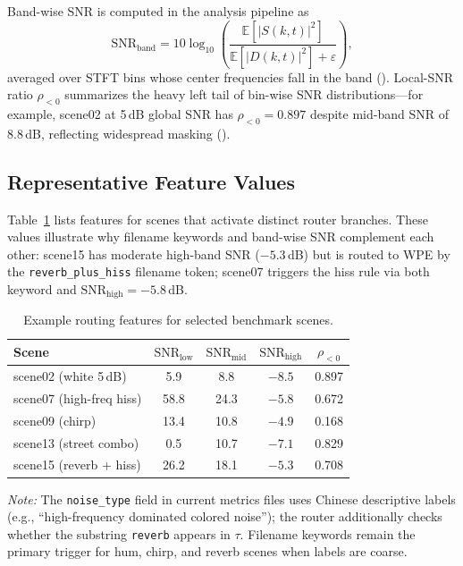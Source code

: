 Band-wise SNR is computed in the analysis pipeline as
\begin{equation}
  \mathrm{SNR}_{\mathrm{band}} = 10\log_{10}\!\left(
    \frac{\mathbb{E}[|S(k,t)|^2]}{\mathbb{E}[|D(k,t)|^2]+\varepsilon}
  \right),
\end{equation}
averaged over STFT bins whose center frequencies fall in the band (). Local-SNR ratio $\rho_{<0}$ summarizes the heavy left tail of bin-wise SNR distributions---for example, scene02 at 5\,dB global SNR has $\rho_{<0}=0.897$ despite mid-band SNR of 8.8\,dB, reflecting widespread masking ().

\subsection{Representative Feature Values}

Table~\ref{tab:routing_feature_examples} lists features for scenes that activate distinct router branches. These values illustrate why filename keywords and band-wise SNR complement each other: scene15 has moderate high-band SNR ($-5.3$\,dB) but is routed to WPE by the \texttt{reverb\_plus\_hiss} filename token; scene07 triggers the hiss rule via both keyword and $\mathrm{SNR}_{\mathrm{high}}=-5.8$\,dB.

\begin{table}[H]
  \centering
  \caption{Example routing features for selected benchmark scenes.}
  \label{tab:routing_feature_examples}
  \small
  \begin{tabular}{lcccc}
    \toprule
    \textbf{Scene} & $\mathrm{SNR}_{\mathrm{low}}$ & $\mathrm{SNR}_{\mathrm{mid}}$ & $\mathrm{SNR}_{\mathrm{high}}$ & $\rho_{<0}$ \\
    \midrule
    scene02 (white 5\,dB)       & 5.9  & 8.8  & $-8.5$ & 0.897 \\
    scene07 (high-freq hiss)    & 58.8 & 24.3 & $-5.8$ & 0.672 \\
    scene09 (chirp)             & 13.4 & 10.8 & $-4.9$ & 0.168 \\
    scene13 (street combo)      & 0.5  & 10.7 & $-7.1$ & 0.829 \\
    scene15 (reverb + hiss)     & 26.2 & 18.1 & $-5.3$ & 0.708 \\
    \bottomrule
  \end{tabular}
\end{table}

\noindent
\textit{Note:} The \texttt{noise\_type} field in current metrics files uses Chinese descriptive labels (e.g., ``high-frequency dominated colored noise''); the router additionally checks whether the substring \texttt{reverb} appears in $\tau$. Filename keywords remain the primary trigger for hum, chirp, and reverb scenes when labels are coarse.

